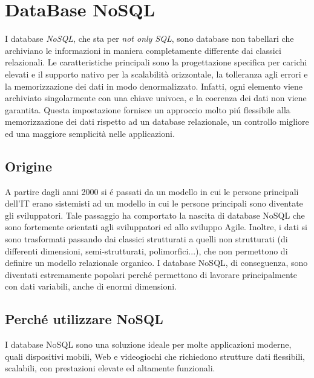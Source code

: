\chapter{DataBase NoSQL}
I database \emph{NoSQL}, che sta per \emph{not only SQL}, sono database non tabellari che archiviano le informazioni
in maniera completamente differente dai classici relazionali.
Le caratteristiche principali sono la progettazione specifica per carichi elevati e il supporto nativo per la scalabilità
orizzontale, la tolleranza agli errori e la memorizzazione dei dati in modo denormalizzato.
Infatti, ogni elemento viene archiviato singolarmente con una chiave univoca, e la coerenza dei dati non viene garantita.
Questa impostazione fornisce un approccio molto piú flessibile alla memorizzazione dei dati rispetto ad un database
relazionale, un controllo migliore ed una maggiore semplicità nelle applicazioni.

\section{Origine}
A partire dagli anni 2000 si é passati da un modello in cui le persone principali dell'IT erano sistemisti ad un modello
in cui le persone principali sono diventate gli sviluppatori. Tale passaggio ha comportato la nascita di database NoSQL
che sono fortemente orientati agli sviluppatori ed allo sviluppo Agile.
Inoltre, i dati si sono trasformati passando dai classici strutturati a quelli non strutturati (di differenti dimensioni,
semi-strutturati, polimorfici...), che non permettono di definire un modello relazionale organico.
I database NoSQL, di conseguenza, sono diventati estremamente popolari perché permettono di lavorare principalmente con dati variabili, anche di enormi
dimensioni.

\section{Perché utilizzare NoSQL}
I database NoSQL sono una soluzione ideale per molte applicazioni moderne, quali dispositivi mobili, Web e videogiochi
che richiedono strutture dati flessibili, scalabili, con prestazioni elevate ed altamente funzionali.
